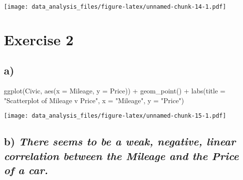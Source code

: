 \documentclass[
]{article}
\newenvironment{Shaded}{\begin{snugshade}}{\end{snugshade}}
\newcommand{\AttributeTok}[1]{\textcolor[rgb]{0.77,0.63,0.00}{#1}}
\newcommand{\FunctionTok}[1]{\textcolor[rgb]{0.00,0.00,0.00}{#1}}
\newcommand{\NormalTok}[1]{#1}
\newcommand{\SpecialCharTok}[1]{\textcolor[rgb]{0.00,0.00,0.00}{#1}}
\newcommand{\StringTok}[1]{\textcolor[rgb]{0.31,0.60,0.02}{#1}}
\begin{document}
\texttt{[image: data\_analysis\_files/figure-latex/unnamed-chunk-14-1.pdf]}

\hypertarget{exercise-2}{%
\section{Exercise 2}\label{exercise-2}}

\hypertarget{a-1}{%
\subsection{a)}\label{a-1}}

\begin{Shaded}
\begin{Highlighting}[]
\FunctionTok{ggplot}\NormalTok{(Civic, }\FunctionTok{aes}\NormalTok{(}\AttributeTok{x =}\NormalTok{ Mileage, }\AttributeTok{y =}\NormalTok{ Price)) }\SpecialCharTok{+}
  \FunctionTok{geom\_point}\NormalTok{() }\SpecialCharTok{+}
  \FunctionTok{labs}\NormalTok{(}\AttributeTok{title =} \StringTok{"Scatterplot of Mileage v Price"}\NormalTok{,}
       \AttributeTok{x =} \StringTok{"Mileage"}\NormalTok{,}
       \AttributeTok{y =} \StringTok{"Price"}\NormalTok{)}
\end{Highlighting}
\end{Shaded}

\texttt{[image: data\_analysis\_files/figure-latex/unnamed-chunk-15-1.pdf]}

\hypertarget{b-there-seems-to-be-a-weak-negative-linear-correlation-between-the-mileage-and-the-price-of-a-car.}{%
\subsection{\texorpdfstring{b) \emph{There seems to be a weak, negative,
linear correlation between the Mileage and the Price of a
car.}}{b) There seems to be a weak, negative, linear correlation between the Mileage and the Price of a car.}}\label{b-there-seems-to-be-a-weak-negative-linear-correlation-between-the-mileage-and-the-price-of-a-car.}}
\end{document}
